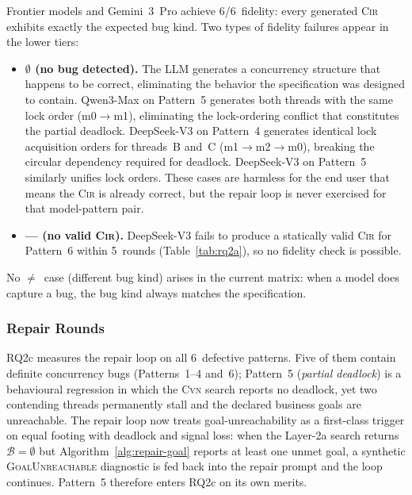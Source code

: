 Frontier models and Gemini~3~Pro achieve 6/6~fidelity: every generated \textsc{Cir} exhibits exactly the expected bug kind. Two types of fidelity failures appear in the lower tiers:

\begin{itemize}[leftmargin=1.4em]
  \item \textbf{$\emptyset$ (no bug detected).}
    The LLM generates a concurrency structure that happens to be correct, eliminating the behavior the     specification was designed to contain. Qwen3-Max on Pattern~5 generates both threads with the same lock order (\textsf{m0}$\to$\textsf{m1}), eliminating the lock-ordering conflict that constitutes the partial deadlock.
    DeepSeek-V3 on Pattern~4 generates identical lock acquisition orders for threads~B and~C (\textsf{m1}$\to$\textsf{m2}$\to$\textsf{m0}), breaking the circular dependency required for deadlock. DeepSeek-V3 on Pattern~5 similarly unifies lock orders. These cases are harmless for the end user that means the \textsc{Cir} is already correct, but the repair loop is never exercised for that model-pattern pair.

  \item \textbf{--- (no valid \textsc{Cir}).}
    DeepSeek-V3 fails to produce a statically valid \textsc{Cir} for Pattern~6 within 5~rounds (Table~\ref{tab:rq2a}), so no fidelity check is possible.
\end{itemize}

No $\neq$~case (different bug kind) arises in the current matrix: when a model does capture a bug, the bug kind always matches the specification.



\subsubsection{Repair Rounds}
\label{subsubsec:rq2c}

RQ2c measures the repair loop on all 6~defective patterns. Five of them contain definite concurrency bugs (Patterns~1--4 and~6); Pattern~5 (\emph{partial deadlock}) is a behavioural regression in which the \textsc{Cvn} search reports no deadlock, yet two contending threads permanently stall and the declared business goals are unreachable. The repair loop now treats goal-unreachability as a first-class trigger on equal footing with deadlock and signal loss: when the Layer-2a search returns $\mathcal{B}=\emptyset$ but Algorithm~\ref{alg:repair-goal} reports at least one unmet goal, a synthetic \textsc{GoalUnreachable} diagnostic is fed back into the repair prompt and the loop continues. Pattern~5 therefore enters RQ2c on its own merits.

